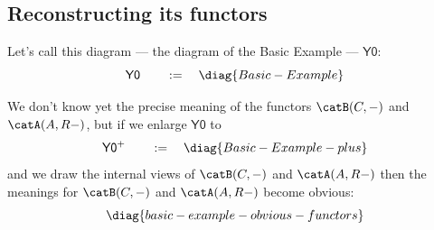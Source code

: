 \documentclass[oneside,12pt]{article}
\begin{document}
%                                                                 
\subsection{Reconstructing its functors \DONE}
\label{basic-example-functors}

\def\Yzero    {\mathsf{Y0}}
\def\Yzeroplus{\mathsf{Y0^+}}
\def\Yone     {\mathsf{Y1}}

Let's call this diagram --- the diagram of the Basic Example ---
$\Yzero$:
%
$$\Yzero \qquad := \quad \diag{Basic-Example}$$

We don't know yet the precise meaning of the functors $\catB(C,-)$ and
$\catA(A,R-)$, but if we enlarge $\Yzero$ to
%
%
$$\pu
  \Yzeroplus \qquad := \quad \diag{Basic-Example-plus}
$$
%
and we draw the internal views of $\catB(C,-)$ and $\catA(A,R-)$ then
the meanings for $\catB(C,-)$ and $\catA(A,R-)$ become obvious:
%
$$\pu
  \diag{basic-example-obvious-functors}
$$
\end{document}
